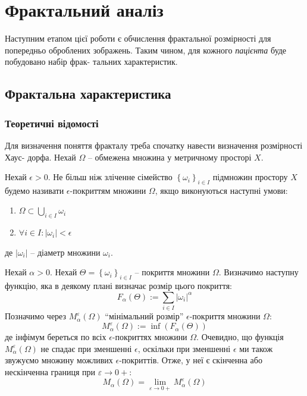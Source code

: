 
\chapter{Фрактальний аналіз} %

\label{Chapter3} %


Наступним етапом цієї роботи є обчислення фрактальної розмірності для попередньо оброблених зображень. Таким чином, для кожного \textit{пацієнта} буде побудовано набір фрак- тальних характеристик.

\section{Фрактальна характеристика}
\subsection{Теоретичні відомості}

Для визначення поняття фракталу треба спочатку навести визначення розмірності Хаус- дорфа. Нехай $\Omega$ -- обмежена множина у метричному просторі $X$.

\begin{defn}
	Нехай $\epsilon > 0$. Не більш ніж зліченне сімейство $\left\{ \omega_i \right\}_{i \in I}$ підмножин простору $X$ будемо називати \textbf{$\epsilon \textit{-покриттям}$} множини $\Omega$, якщо виконуються наступні умови:
	\begin{enumerate}[label=(\arabic*),ref=(\arabic*)]
		\item $\Omega \subset \bigcup\limits_{i \in I}{\omega_i}$
		\item $\forall i \in I: |\omega_i| < \epsilon$
	\end{enumerate}
	де $|\omega_i|$ -- діаметр множини $\omega_i$.
\end{defn}

Нехай $\alpha > 0$. Нехай $\Theta = \left\{ \omega_i \right\}_{i \in I}$ -- покриття множини $\Omega$. Визначимо наступну функцію, яка в деякому плані визначає розмір цього покриття: 
$$F_\alpha(\Theta):=\sum\limits_{i\in I} |\omega_i|^\alpha$$
Позначимо через $M^{\varepsilon}_{\alpha}(\Omega)$ \enquote{мінімальний розмір} $\epsilon$-покриття множини $\Omega$:
$$M^{\varepsilon}_{\alpha}(\Omega) := \inf(F_\alpha(\Theta))$$
де інфімум береться по всіх $\epsilon$-покриттях множини $\Omega$. Очевидно, що функція $M^{\varepsilon}_{\alpha}(\Omega)$ не спадає при зменшенні $\epsilon$, оскільки при зменшенні $\epsilon$ ми також звужуємо множину можливих $\epsilon$-покриттів. Отже, у неї є скінченна або нескінченна границя при $\varepsilon\rightarrow 0+$:
$$M_{\alpha}(\Omega)=\lim\limits_{\varepsilon\rightarrow 0+}M^{\varepsilon}_{\alpha}(\Omega)$$

